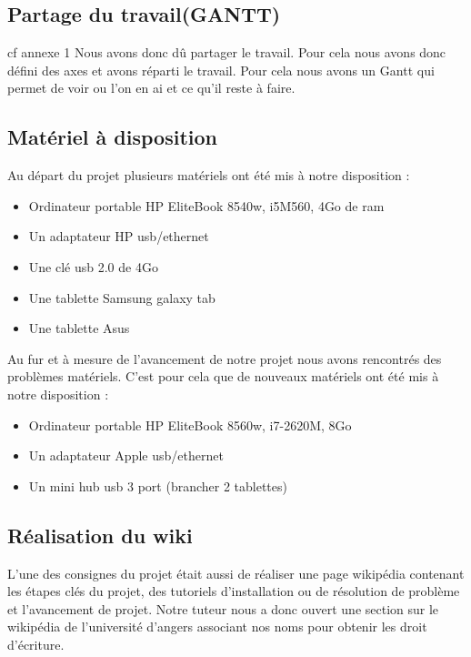 \documentclass[a4paper,12pt]{extarticle}
\begin{document}
\subsection{Partage du travail(GANTT)}

cf annexe 1
Nous avons donc dû partager le travail. Pour cela nous avons donc défini des axes et avons réparti le travail. Pour cela nous avons un Gantt qui permet de voir ou l’on en ai et ce qu’il reste à faire.\\

\subsection{Matériel à disposition}

Au départ du projet plusieurs matériels ont été mis à notre disposition :
\begin{itemize}
\item Ordinateur portable HP EliteBook 8540w, i5M560, 4Go de ram
\item Un adaptateur HP usb/ethernet
\item Une clé usb 2.0 de 4Go
\item Une tablette Samsung galaxy tab
\item Une tablette Asus\\
\end{itemize}

Au fur et à mesure de l’avancement de notre projet nous avons rencontrés des problèmes matériels. C’est pour cela que de nouveaux matériels ont été mis à notre disposition :
\begin{itemize}
\item Ordinateur portable HP EliteBook 8560w, i7-2620M, 8Go
\item Un adaptateur Apple usb/ethernet
\item Un mini hub usb 3 port (brancher 2 tablettes)
\end{itemize}

\subsection{Réalisation du wiki}

L’une des consignes du projet était aussi de réaliser une page wikipédia contenant les étapes clés du projet, des tutoriels d’installation ou de résolution de problème et l’avancement de projet.
Notre tuteur nous a donc ouvert une section sur le wikipédia de l’université d’angers associant nos noms pour obtenir les droit d’écriture.\\
\end{document}
